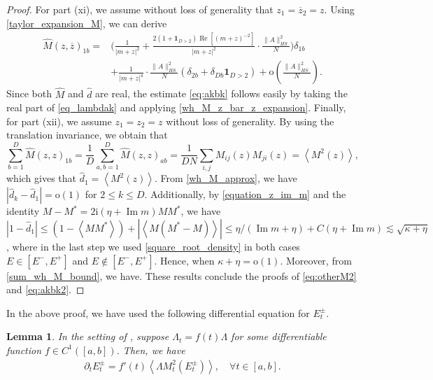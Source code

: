 \documentclass[10pt,reqno]{amsart}
\numberwithin{equation}{section}
\numberwithin{figure}{section}
\theoremstyle{plain} %
\newtheorem{lemma}[theorem]{Lemma}
\theoremstyle{definition} %
\newcommand{\ii}{\mathrm{i}}
\renewcommand{\leq}{\le}
\renewcommand{\bar}{\overline}
\newcommand{\pa}[1]{\left({#1}\right)}
\newcommand{\qa}[1]{\left[{#1}\right]}
\newcommand{\avga}[1]{\left\langle #1 \right\rangle}
\DeclareMathOperator{\re}{\mathrm{Re}}
\DeclareMathOperator{\im}{\mathrm{Im}}
\newcommand{\oo}{\mathrm{o}}
\numberwithin{equation}{section}
\begin{document}
\begin{proof}
 
 For part (xi), we assume without loss of generality that $z_1=\bar{z}_2=z$. Using \eqref{taylor_expansion_M}, we can derive 
\begin{equation}\label{wh_M_z_bar_z_expansion}
    \begin{aligned}
        \widehat{M}(z, \bar{z})_{1 b}= & \bigg(\frac{1}{|m+z|^2}+\frac{2\left(1+\mathbf{1}_{D>2}\right)\re [\pa{m+z}^{-2}]}{|m+z|^2} \cdot \frac{\|A\|_{H S}^2}{N}\bigg) \delta_{1 b} \\ & +\frac{1}{|m+z|^{4}}\cdot \frac{\|A\|_{H S}^2}{N}\left(\delta_{2 b}+\delta_{D b}\mathbf{1}_{D>2} \right)+\oo\left(\frac{\|A\|_{H S}^2}{N}\right).
    \end{aligned}
\end{equation}
Since both $\widehat{M}$ and $\widehat{d}$ are real, the estimate \eqref{eq:akbk} follows easily by taking the real part of \eqref{eq_lambdak} and applying \eqref{wh_M_z_bar_z_expansion}.
Finally, for part (xii), we assume $z_1=z_2=z$ without loss of generality. By using the translation invariance, we obtain that 
$$
\sum_{b=1}^D \widehat{M}(z, z)_{1 b}=\frac{1}{D} \sum_{a, b=1}^D \widehat{M}(z, z)_{a b}=\frac{1}{D N} \sum_{i, j} M_{i j}(z) M_{j i}(z)=\left\langle M^2(z)\right\rangle,
$$
which gives that $\widehat{d}_1=\left\langle M^2 (z) \right\rangle$. From \eqref{wh_M_approx}, we have $|\widehat{d}_k-\widehat{d}_1|=\oo(1)$ for $2\le k\le D$. Additionally, by \eqref{equation_z_im_m} and the identity $M-M^*=2\ii(\eta+\im m)MM^*$, we have $|1-\widehat{d}_1|\le (1-\avga{MM^*})+|\avga{M(M^*-M)}|\le \eta/(\im m+\eta)+C(\eta+\im m)\lesssim\sqrt{\kappa+\eta}$, where in the last step we used \eqref{square_root_density} in both cases $E\in[E^-,E^+]$ and $E\notin[E^-,E^+]$. Hence, \smash{$\widehat{d}_1=1+\oo(1)$} when $\kappa+\eta=\oo(1)$.  Moreover, from \eqref{sum_wh_M_bound}, we have\smash{$\operatorname{Re} \widehat{d}_k \leq d_1$}. These results conclude the proofs of \eqref{eq:otherM2} and \eqref{eq:akbk2}. %
\end{proof}


In the above proof, we have used the following differential equation for $E_t^\pm$.

\begin{lemma}
    In the setting of , suppose $\Lambda_t=f\pa{t}\Lambda$ for some differentiable function $f\in C^1(\qa{a,b})$. Then, we have    \begin{equation}\label{derivative_of_edge}
        \begin{aligned}
            \partial_t E_t^{\pm}=f'\pa{t}\avga{\Lambda M_t^2(E_t^{\pm})},\quad \forall t\in\qa{a,b}.
        \end{aligned}
    \end{equation}
\end{lemma}
\end{document}

